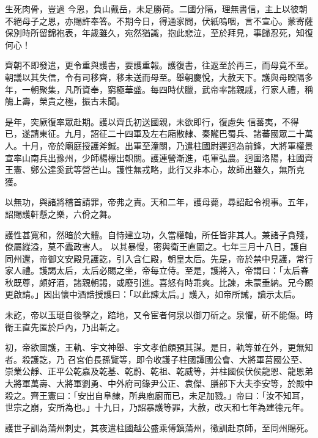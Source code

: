\begin{pinyinscope}
 生死肉骨，豈過
 今恩，負山戴岳，未足勝荷。二國分隔，理無書信，主上以彼朝不絕母子之恩，亦賜許奉答。不期今日，得通家問，伏紙嗚咽，言不宣心。蒙寄薩保別時所留錦袍表，年歲雖久，宛然猶識，抱此悲泣，至於拜見，事歸忍死，知復何心！



 齊朝不即發遣，更令重與護書，要護重報。護復書，往返至於再三，而母竟不至。朝議以其失信，令有司移齊，移未送而母至。舉朝慶悅，大赦天下。護與母暌隔多年，一朝聚集，凡所資奉，窮極華盛。每四時伏臘，武帝率諸親戚，行家人禮，稱觴上壽，榮貴之極，振古未聞。



 是年，突厥復率眾赴期。護以齊氏初送國親，未欲即行，復慮失
 信蕃夷，不得已，遂請東征。九月，詔征二十四軍及左右廂散隸、秦隴巴蜀兵、諸蕃國眾二十萬人。十月，帝於廟庭授護斧鋮。出軍至潼關，乃遣柱國尉遲迥為前鋒，大將軍權景宣率山南兵出豫州，少師楊標出軹關。護連營漸進，屯軍弘農。迥圍洛陽，柱國齊王憲、鄭公達奚武等營芒山。護性無戎略，此行又非本心，故師出雖久，無所克獲。



 以無功，與諸將稽首請罪，帝弗之責。天和二年，護母薨，尋詔起令視事。五年，詔賜護軒懸之樂，六佾之舞。



 護性甚寬和，然暗於大體。自恃建立功，久當權軸，所任皆非其人。兼諸子貪殘，僚屬縱溢，莫不蠹政害人。
 以其暴慢，密與衛王直圖之。七年三月十八日，護自同州還，帝御文安殿見護訖，引入含仁殿，朝皇太后。先是，帝於禁中見護，常行家人禮。護謁太后，太后必賜之坐，帝每立侍。至是，護將入，帝謂曰：「太后春秋既尊，頗好酒，諸親朝謁，或廢引進。喜怒有時乖爽。比諫，未蒙垂納。兄今願更啟請。」因出懷中酒誥授護曰：「以此諫太后。」護入，如帝所誡，讀示太后。



 未訖，帝以玉珽自後擊之，踣地，又令宦者何泉以御刀斫之。泉懼，斫不能傷。時衛王直先匿於戶內，乃出斬之。



 初，帝欲圖護，王軌、宇文神舉、宇文孝伯頗預其謀。是日，軌等並在外，更無知者。殺護訖，乃
 召宮伯長孫覽等，即令收護子柱國譚國公會、大將軍莒國公至、崇業公靜、正平公乾嘉及乾基、乾蔚、乾祖、乾威等，并柱國侯伏侯龍恩、龍恩弟大將軍萬壽、大將軍劉勇、中外府司錄尹公正、袁傑、膳部下大夫李安等，於殿中殺之。齊王憲曰：「安出自阜隸，所典庖廚而已，未足加戮。」帝曰：「汝不知耳，世宗之崩，安所為也。」十九日，乃詔暴護等罪，大赦，改天和七年為建德元年。



 護世子訓為蒲州刺史，其夜遣柱國越公盛乘傅鎮蒲州，徵訓赴京師，至同州賜死。




\end{pinyinscope}
